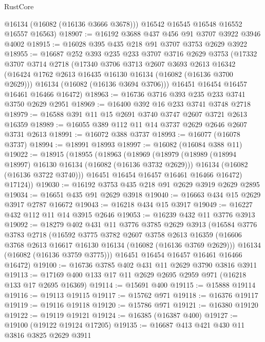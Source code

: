 \begin{lexlean}{RustCore}
\begin{coremodule}
        @16134
        (@16082 (@16136 @3666 @3678)))
      @16542
      @16545
      @16548
      @16552
      @16557
      @16563)
@18907 := @16192 @3688 @437 @456 @91 @3707 @3922 @3946 @4002
@18915 := @16028 @395 @435 @218 @91 @3707 @3753 @2629 @3922
@18955 := @16687
    @252
    @393
    @235
    @233
    @3707
    @3716
    @2629
    @3753
    (@17332
      @3707
      @3714
      @2718
      (@17340
        @3706
        @3713
        @2607
        @3693
        @2613
        @16342
        (@16424 @1762 @2613 @16435 @16130 @16134 (@16082 (@16136 @3700 @2629)))
        @16134
        (@16082 (@16136 @3694 @3706)))
      @16451
      @16454
      @16457
      @16461
      @16466
      @16472)
@18963 := @16736 @3716 @393 @235 @233 @3741 @3750 @2629 @2951
@18969 := @16400 @392 @16 @233 @3741 @3748 @2718
@18979 := @16588 @391 @11 @15 @2691 @3740 @3747 @2607 @3721 @2613 @16359
@18989 := @16055 @389 @112 @11 @14 @3737 @2629 @2646 @2607 @3731 @2613
@18991 := @16072 @388 @3737
@18993 := @16077 (@16078 @3737)
@18994 := @18991 @18993
@18997 := @16082 (@16084 @388 @11)
@19022 := @18915
    (@18955
      (@18963
        (@18969
          (@18979
            (@18989 (@18994 @18997) @16130 @16134 (@16082 (@16136 @3732 @2629)))
            @16134
            (@16082 (@16136 @3722 @3740)))
          @16451
          @16454
          @16457
          @16461
          @16466
          @16472)
        @17124))
@19030 := @16192 @3753 @435 @218 @91 @2629 @3919 @2629 @2895
@19034 := @16651 @435 @91 @2629 @3918
@19040 := @16663 @434 @15 @2629 @3917 @2787 @16672
@19043 := @16218 @434 @15 @3917
@19049 := @16227 @432 @112 @11 @14 @3915 @2646
@19053 := @16239 @432 @11 @3776 @3913
@19092 := @18279
    @402
    @431
    @11
    @3776
    @3785
    @2629
    @3913
    (@16584
      @3776
      @3783
      @2718
      (@16592
        @3775
        @3782
        @2607
        @3758
        @2613
        @16359
        (@16606 @3768 @2613 @16617 @16130 @16134 (@16082 (@16136 @3769 @2629)))
        @16134
        (@16082 (@16136 @3759 @3775)))
      @16451
      @16454
      @16457
      @16461
      @16466
      @16472)
@19100 := @16736 @3785 @402 @431 @11 @2629 @3790 @3816 @3911
@19113 := @17169 @400 @133 @17 @11 @2629 @2695 @2959 @971 (@16218 @133 @17 @2695 @16369)
@19114 := @15691 @400
@19115 := @15888 @19114
@19116 := @19113 @19115
@19117 := @15762 @971
@19118 := @16376 @19117
@19119 := @19116 @19118
@19120 := @15786 @971
@19121 := @16380 @19120
@19122 := @19119 @19121
@19124 := @16385 (@16387 @400)
@19127 := @19100 (@19122 @19124 @17205)
@19135 := @16687 @413 @421 @430 @11 @3816 @3825 @2629 @3911

\end{coremodule}
\end{lexlean}
